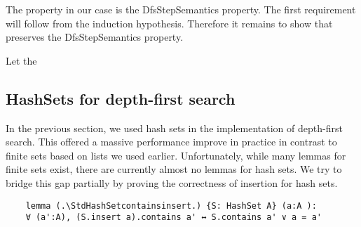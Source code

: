 The property in our case is the DfsStepSemantics property. The first requirement will follow from the induction hypothesis. Therefore it remains to show that \dfsstep preserves the DfsStepSemantics property. 

\begin{lemma}
  Let the 
\end{lemma}

\subsection{HashSets for depth-first search}

In the previous section, we used hash sets in the implementation of depth-first search. This offered a massive performance improve in practice in contrast to finite sets based on lists we used earlier. Unfortunately, while many lemmas for finite sets exist, there are currently almost no lemmas for hash sets. We try to bridge this gap partially by proving the correctness of insertion for hash sets.

\begin{lstlisting}
    lemma (.\StdHashSetcontainsinsert.) {S: HashSet A} (a:A ): 
    ∀ (a':A), (S.insert a).contains a' ↔ S.contains a' ∨ a = a' 

\end{lstlisting}